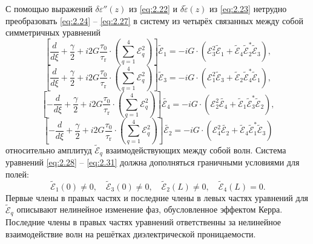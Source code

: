 С помощью выражений $\delta \varepsilon''(z)$ из \eqref{eq:2.22} и  $\delta \tilde{\varepsilon} (z)$ из \eqref{eq:2.23} нетрудно преобразовать \eqref{eq:2.24} -- \eqref{eq:2.27} в систему из четырёх связанных между собой симметричных уравнений
\begin{equation}
	\label{eq:2.28}
	\left[\frac{d}{d \xi}+\frac{\gamma}{2}+i 2 G \frac{\tau_{0}}{\tau_{\mathrm{r}}} \cdot\left(\sum_{q=1}^{4} \mathcal{E}_{q}^{2}\right)\right] \tilde{\mathcal{E}}_{1}=-i G \cdot\left({\mathcal { E }}_{3}^{2} \tilde{\mathcal{E}}_{1}+\tilde{\mathcal{E}}_{4} \tilde{\mathcal{E}}_{2}^{*} \tilde{\mathcal{E}}_{3}\right),
\end{equation}
\begin{equation}
	\label{eq:2.29}
	\left[\frac{d}{d \xi}+\frac{\gamma}{2}+i 2 G \frac{\tau_{0}}{\tau_{\mathrm{r}}} \cdot\left(\sum_{q=1}^{4} \mathcal{E}_{q}^{2}\right)\right] \tilde{\mathcal{E}}_{3}=-i G \cdot\left({\mathcal { E }}_{1}^{2} \tilde{\mathcal{E}}_{3}+\tilde{\mathcal{E}}_{2} \tilde{\mathcal{E}}_{4}^{*} \tilde{\mathcal{E}}_{1}\right),
\end{equation}
\begin{equation}
	\label{eq:2.30}
	\left[-\frac{d}{d \xi}+\frac{\gamma}{2}+i 2 G \frac{\tau_{0}}{\tau_{\mathrm{r}}} \cdot\left(\sum_{q=1}^{4} \mathcal{E}_{q}^{2}\right)\right] \tilde{\mathcal{E}_{4}}=-i G \cdot\left(\mathcal{E}_{2}^{2} \tilde{\mathcal{E}_{4}}+\tilde{\mathcal{E}}_{1} \tilde{\mathcal{E}}_{3}^{*} \tilde{\mathcal{E}}_{2}\right),
\end{equation}
\begin{equation}
	\label{eq:2.31}
	\left[-\frac{d}{d \xi}+\frac{\gamma}{2}+i 2 G \frac{\tau_{0}}{\tau_{\mathrm{r}}} \cdot\left(\sum_{q=1}^{4} \mathcal{E}_{q}^{2}\right)\right] \tilde{\mathcal{E}_{2}}=-i G \cdot\left(\mathcal{E}_{4}^{2} \tilde{\mathcal{E}_{2}}+\tilde{\mathcal{E}}_{4} \tilde{\mathcal{E}}_{1}^{*} \tilde{\mathcal{E}}_{3}\right)	
\end{equation}
относительно амплитуд $\tilde{\mathcal{E}}_q$ взаимодействующих между собой волн. Система уравнений \eqref{eq:2.28} -- \eqref{eq:2.31} должна дополняться граничными условиями для полей:
\begin{equation}
	\label{eq:2.32}
	\tilde{\mathcal{E}}_{1}(0) \neq 0, \quad \tilde{\mathcal{E}}_{3}(0) \neq 0, \quad \tilde{\mathcal{E}}_{2}(L) \neq 0, \quad \tilde{\mathcal{E}}_{4}(L)=0.
\end{equation}
Первые члены в правых частях и последние члены в левых частях уравнений для $\tilde{\mathcal{E}}_q$ описывают нелинейное изменение фаз, обусловленное эффектом Керра. Последние члены в правых частях уравнений ответственны за нелинейное взаимодействие волн на решётках диэлектрической проницаемости.

